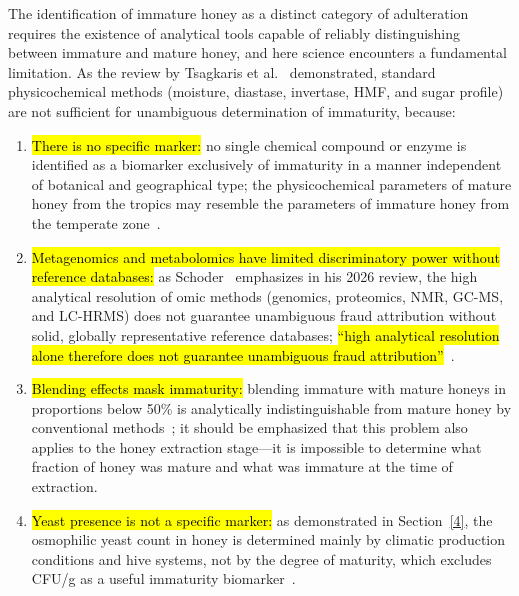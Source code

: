 \documentclass[foods,review,accept,pdftex,moreauthors]{Definitions/mdpi}
\begin{document}
{The identification of immature honey as a distinct category of
adulteration requires the existence of analytical tools capable of
reliably distinguishing between immature and mature honey, and here
science encounters a fundamental limitation. As the review by
Tsagkaris et al.~\cite{tsagkaris2021} demonstrated, standard
physicochemical methods (moisture, diastase, invertase, HMF,
and sugar profile) are not sufficient for unambiguous determination
of immaturity, because:

\begin{enumerate}
    \item \hl{There is no specific marker:}
          no single chemical compound or enzyme is identified
          as a biomarker exclusively of immaturity in a manner
          independent of botanical and geographical type;
          the physicochemical parameters of mature honey from
          the tropics may resemble the parameters of immature
          honey from the temperate zone~\cite{tsagkaris2021,guo2020}.
    \item \hl{Metagenomics and metabolomics have limited
          discriminatory power without reference databases:}
          as Schoder~\cite{schoder2026} emphasizes in his 2026
          review, the high analytical resolution of omic methods
          (genomics, proteomics, NMR, GC-MS, and LC-HRMS) does not
          guarantee unambiguous fraud attribution without solid,
          globally representative reference databases;
          \hl{``high analytical resolution alone therefore
          does not guarantee unambiguous fraud
          attribution''}~\cite{schoder2026}.
    \item \hl{Blending effects mask immaturity:}
          blending immature with mature honeys in proportions
          below 50\% is analytically indistinguishable from mature
          honey by conventional methods~\cite{schoder2026}; it
          should be emphasized that this problem also applies to
          the honey extraction stage---it is impossible to
          determine what fraction of honey was mature and what
          was immature at the time of extraction.
    \item \hl{Yeast presence is not a specific marker:}
          as demonstrated in Section~\ref{4}, the osmophilic yeast count
          in honey is determined mainly by climatic production
          conditions and hive systems, not by the degree of
          maturity, which excludes CFU/g as a useful immaturity
          biomarker~\cite{rodriguezmachado2024,schoder2026}.
\end{enumerate}

}
\end{document}
